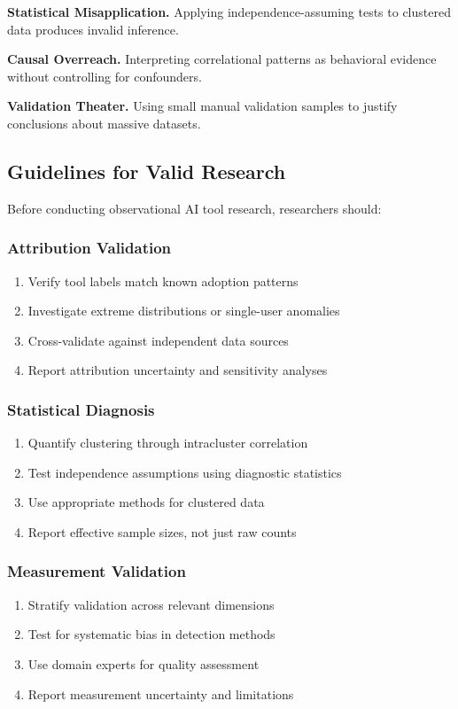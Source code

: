 \documentclass[conference]{IEEEtran}
\begin{document}
\textbf{Statistical Misapplication.} Applying independence-assuming tests to clustered data produces invalid inference.

\textbf{Causal Overreach.} Interpreting correlational patterns as behavioral evidence without controlling for confounders.

\textbf{Validation Theater.} Using small manual validation samples to justify conclusions about massive datasets.

\subsection{Guidelines for Valid Research}

Before conducting observational AI tool research, researchers should:

\subsubsection{Attribution Validation}
\begin{enumerate}
\item Verify tool labels match known adoption patterns
\item Investigate extreme distributions or single-user anomalies  
\item Cross-validate against independent data sources
\item Report attribution uncertainty and sensitivity analyses
\end{enumerate}

\subsubsection{Statistical Diagnosis}
\begin{enumerate}
\item Quantify clustering through intracluster correlation
\item Test independence assumptions using diagnostic statistics
\item Use appropriate methods for clustered data
\item Report effective sample sizes, not just raw counts
\end{enumerate}

\subsubsection{Measurement Validation}
\begin{enumerate}
\item Stratify validation across relevant dimensions
\item Test for systematic bias in detection methods
\item Use domain experts for quality assessment
\item Report measurement uncertainty and limitations
\end{enumerate}
\end{document}
